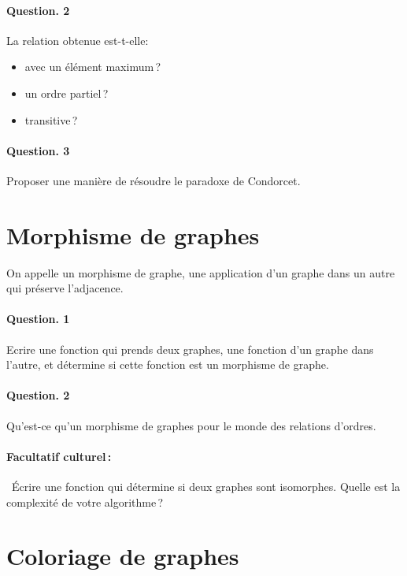 \documentclass[10pt,a4paper]{article}
\begin{document}
\paragraph{Question. 2\\}
La relation obtenue est-t-elle:
\begin{itemize}
\item avec un élément maximum\,?
\item un ordre partiel\,?
\item transitive\,?
\end{itemize}
\paragraph{Question. 3\\}
Proposer une manière de résoudre le paradoxe de Condorcet.

\section{Morphisme de graphes}
On appelle un morphisme de graphe, une application d'un graphe dans un
autre qui préserve l'adjacence.

\paragraph{Question. 1\\} Ecrire une fonction qui prends deux graphes,
une fonction d'un graphe dans l'autre, et détermine si cette fonction est
un morphisme de graphe. 

\paragraph{Question. 2\\}
Qu'est-ce qu'un morphisme de graphes pour le monde des relations d'ordres. 

\paragraph{Facultatif culturel\,:\\} Écrire une fonction qui détermine si deux graphes
sont isomorphes. Quelle est la complexité de votre algorithme\,?

\section{Coloriage de graphes}
\end{document}
